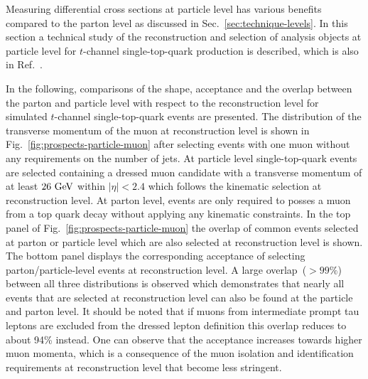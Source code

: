 Measuring differential cross sections at particle level has various benefits compared to the parton level as discussed in Sec.~\ref{sec:technique-levels}. In this section a technical study of the reconstruction and selection of analysis objects at particle level for $t$-channel single-top-quark production is described, which is also in Ref.~\cite{particleStudies}.

In the following, comparisons of the shape, acceptance and the overlap between the parton and particle level with respect to the reconstruction level for simulated $t$-channel single-top-quark events are presented. The distribution of the transverse momentum of the muon at reconstruction level is shown in Fig.~\ref{fig:prospects-particle-muon} after selecting events with one muon without any requirements on the number of jets. At particle level single-top-quark events are selected containing a dressed muon candidate with a transverse momentum of at least $26~\textrm{GeV}$ within $|\eta|<2.4$ which follows the kinematic selection at reconstruction level. At parton level, events are only required to posses a muon from a top quark decay without applying any kinematic constraints. In the top panel of Fig.~\ref{fig:prospects-particle-muon} the overlap of common events selected at parton or particle level which are also selected at reconstruction level is shown. The bottom panel displays the corresponding acceptance of selecting parton/particle-level events at reconstruction level. A large overlap~($>99\%$) between all three distributions is observed which demonstrates that nearly all events that are selected at reconstruction level can also be found at the particle and parton level. It should be noted that if muons from intermediate prompt tau leptons are excluded from the dressed lepton definition this overlap reduces to about 94\% instead. One can observe that the acceptance increases towards higher muon momenta, which is a consequence of the muon isolation and identification requirements at reconstruction level that become less stringent. 

